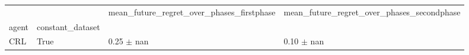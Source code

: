 \begin{tabular}{llll}
\toprule
 &  & mean_future_regret_over_phases_firstphase & mean_future_regret_over_phases_secondphase \\
agent & constant_dataset &  &  \\
\midrule
CRL & True & 0.25 $\pm$ nan & 0.10 $\pm$ nan \\
\cline{1-4}
\bottomrule
\end{tabular}
